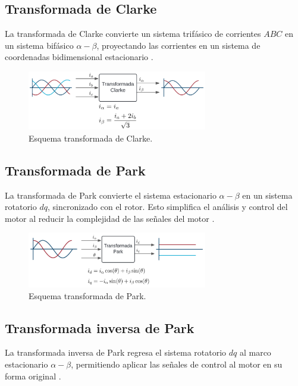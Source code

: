 \documentclass[11pt]{report}
\begin{document}
\newpage
\subsection{Transformada de Clarke}
La transformada de Clarke convierte un sistema trifásico de corrientes \(ABC\) en un sistema bifásico \(\alpha-\beta\), proyectando las corrientes en un sistema de coordenadas bidimensional estacionario \cite{AN1078}.

\begin{figure}[ht]
	\centering
	\includegraphics[width=0.7\textwidth]{imagenes/clarke.png}
	\caption{Esquema transformada de Clarke.}
	\label{fig:clarke_transform}
\end{figure}
\FloatBarrier

\subsection{Transformada de Park}
La transformada de Park convierte el sistema estacionario \(\alpha-\beta\) en un sistema rotatorio \(dq\), sincronizado con el rotor. Esto simplifica el análisis y control del motor al reducir la complejidad de las señales del motor \cite{AN1078}.

\begin{figure}[ht]
	\centering
	\includegraphics[width=0.7\textwidth]{imagenes/park.png}
	\caption{Esquema transformada de Park.}
\end{figure}
\FloatBarrier

\subsection{Transformada inversa de Park}
La transformada inversa de Park regresa el sistema rotatorio \(dq\) al marco estacionario \(\alpha-\beta\), permitiendo aplicar las señales de control al motor en su forma original \cite{AN1078}.
\end{document}

